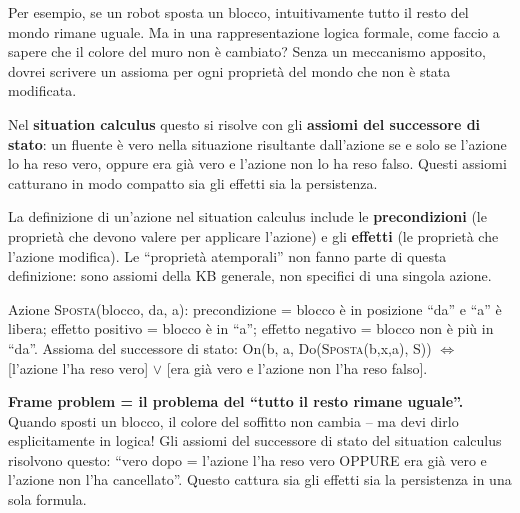 \documentclass[12pt,a4paper]{article}
\begin{document}
Per esempio, se un robot sposta un blocco, intuitivamente tutto il resto del mondo rimane uguale. Ma in una rappresentazione logica formale, come faccio a sapere che il colore del muro non è cambiato? Senza un meccanismo apposito, dovrei scrivere un assioma per ogni proprietà del mondo che non è stata modificata.

Nel \textbf{situation calculus} questo si risolve con gli \textbf{assiomi del successore di stato}: un fluente è vero nella situazione risultante dall'azione se e solo se l'azione lo ha reso vero, oppure era già vero e l'azione non lo ha reso falso. Questi assiomi catturano in modo compatto sia gli effetti sia la persistenza.

La definizione di un'azione nel situation calculus include le \textbf{precondizioni} (le proprietà che devono valere per applicare l'azione) e gli \textbf{effetti} (le proprietà che l'azione modifica). Le ``proprietà atemporali'' non fanno parte di questa definizione: sono assiomi della KB generale, non specifici di una singola azione.

\begin{esempiobox}
Azione \textsc{Sposta}(blocco, da, a): precondizione = blocco è in posizione ``da'' e ``a'' è libera; effetto positivo = blocco è in ``a''; effetto negativo = blocco non è più in ``da''. Assioma del successore di stato: On(b, a, Do(\textsc{Sposta}(b,x,a), S)) $\Leftrightarrow$ [l'azione l'ha reso vero] $\lor$ [era già vero e l'azione non l'ha reso falso].
\end{esempiobox}

\begin{ricordabox}
\textbf{Frame problem = il problema del ``tutto il resto rimane uguale''.} Quando sposti un blocco, il colore del soffitto non cambia -- ma devi dirlo esplicitamente in logica! Gli assiomi del successore di stato del situation calculus risolvono questo: ``vero dopo = l'azione l'ha reso vero OPPURE era già vero e l'azione non l'ha cancellato''. Questo cattura sia gli effetti sia la persistenza in una sola formula.
\end{ricordabox}
\end{document}
